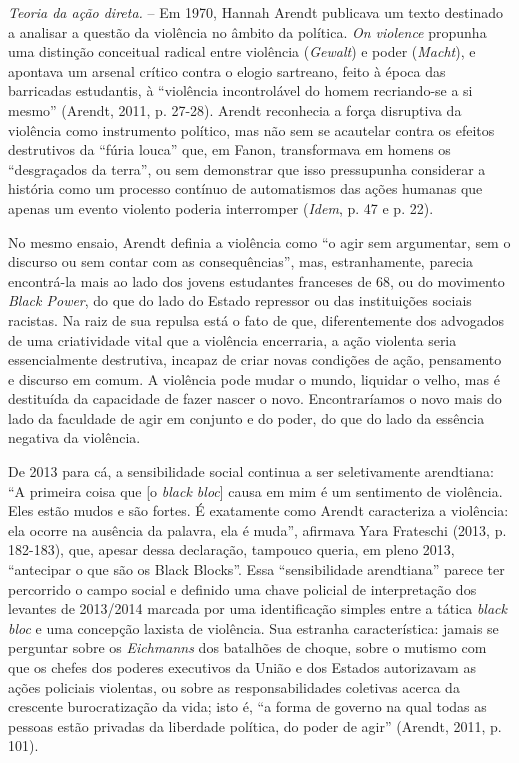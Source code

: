 \emph{Teoria da ação direta.} -- Em 1970, Hannah Arendt publicava um
texto destinado a analisar a questão da violência no âmbito da política.
\emph{On violence} propunha uma distinção conceitual radical entre
violência (\emph{Gewalt}) e poder (\emph{Macht}), e apontava um arsenal
crítico contra o elogio sartreano, feito à época das barricadas
estudantis, à ``violência incontrolável do homem recriando-se a si
mesmo'' (Arendt, 2011, p. 27-28). Arendt reconhecia a força disruptiva
da violência como instrumento político, mas não sem se acautelar contra
os efeitos destrutivos da ``fúria louca'' que, em Fanon, transformava em
homens os ``desgraçados da terra'', ou sem demonstrar que isso
pressupunha considerar a história como um processo contínuo de
automatismos das ações humanas que apenas um evento violento poderia
interromper (\emph{Idem}, p. 47 e p. 22).

No mesmo ensaio, Arendt definia a violência como ``o agir sem
argumentar, sem o discurso ou sem contar com as consequências'', mas,
estranhamente, parecia encontrá-la mais ao lado dos jovens estudantes
franceses de 68, ou do movimento \emph{Black Power}, do que do lado do
Estado repressor ou das instituições sociais racistas. Na raiz de sua
repulsa está o fato de que, diferentemente dos advogados de uma
criatividade vital que a violência encerraria, a ação violenta seria
essencialmente destrutiva, incapaz de criar novas condições de ação,
pensamento e discurso em comum. A violência pode mudar o mundo, liquidar
o velho, mas é destituída da capacidade de fazer nascer o novo.
Encontraríamos o novo mais do lado da faculdade de agir em conjunto e do
poder, do que do lado da essência negativa da violência.

De 2013 para cá, a sensibilidade social continua a ser seletivamente
arendtiana: ``A primeira coisa que {[}o \emph{black bloc}{]} causa em
mim é um sentimento de violência. Eles estão mudos e são fortes. É
exatamente como Arendt caracteriza a violência: ela ocorre na ausência
da palavra, ela é muda'', afirmava Yara Frateschi (2013, p. 182-183),
que, apesar dessa declaração, tampouco queria, em pleno 2013,
``antecipar o que são os Black Blocks''. Essa ``sensibilidade
arendtiana'' parece ter percorrido o campo social e definido uma chave
policial de interpretação dos levantes de 2013/2014 marcada por uma
identificação simples entre a tática \emph{black bloc} e uma concepção
laxista de violência. Sua estranha característica: jamais se perguntar
sobre os \emph{Eichmanns }dos batalhões de choque, sobre o mutismo com
que os chefes dos poderes executivos da União e dos Estados autorizavam
as ações policiais violentas, ou sobre as responsabilidades coletivas
acerca da crescente burocratização da vida; isto é, ``a forma de governo
na qual todas as pessoas estão privadas da liberdade política, do poder
de agir'' (Arendt, 2011, p. 101).

